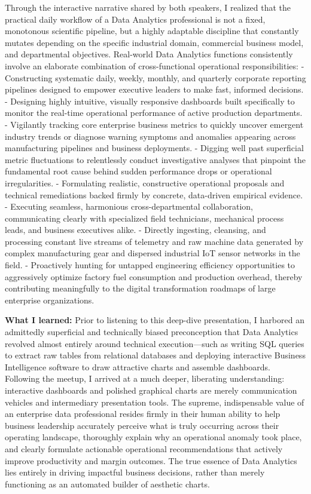 Through the interactive narrative shared by both speakers, I realized
that the practical daily workflow of a Data Analytics professional is
not a fixed, monotonous scientific pipeline, but a highly adaptable
discipline that constantly mutates depending on the specific industrial
domain, commercial business model, and departmental objectives.
Real-world Data Analytics functions consistently involve an elaborate
combination of cross-functional operational responsibilities: -
Constructing systematic daily, weekly, monthly, and quarterly corporate
reporting pipelines designed to empower executive leaders to make fast,
informed decisions. - Designing highly intuitive, visually responsive
dashboards built specifically to monitor the real-time operational
performance of active production departments. - Vigilantly tracking core
enterprise business metrics to quickly uncover emergent industry trends
or diagnose warning symptoms and anomalies appearing across
manufacturing pipelines and business deployments. - Digging well past
superficial metric fluctuations to relentlessly conduct investigative
analyses that pinpoint the fundamental root cause behind sudden
performance drops or operational irregularities. - Formulating
realistic, constructive operational proposals and technical remediations
backed firmly by concrete, data-driven empirical evidence. - Executing
seamless, harmonious cross-departmental collaboration, communicating
clearly with specialized field technicians, mechanical process leads,
and business executives alike. - Directly ingesting, cleansing, and
processing constant live streams of telemetry and raw machine data
generated by complex manufacturing gear and dispersed industrial IoT
sensor networks in the field. - Proactively hunting for untapped
engineering efficiency opportunities to aggressively optimize factory
fuel consumption and production overhead, thereby contributing
meaningfully to the digital transformation roadmaps of large enterprise
organizations.

\textbf{What I learned:} Prior to listening to this deep-dive
presentation, I harbored an admittedly superficial and technically
biased preconception that Data Analytics revolved almost entirely around
technical execution---such as writing SQL queries to extract raw tables
from relational databases and deploying interactive Business
Intelligence software to draw attractive charts and assemble dashboards.
Following the meetup, I arrived at a much deeper, liberating
understanding: interactive dashboards and polished graphical charts are
merely communication vehicles and intermediary presentation tools. The
supreme, indispensable value of an enterprise data professional resides
firmly in their human ability to help business leadership accurately
perceive what is truly occurring across their operating landscape,
thoroughly explain why an operational anomaly took place, and clearly
formulate actionable operational recommendations that actively improve
productivity and margin outcomes. The true essence of Data Analytics
lies entirely in driving impactful business decisions, rather than
merely functioning as an automated builder of aesthetic charts.

